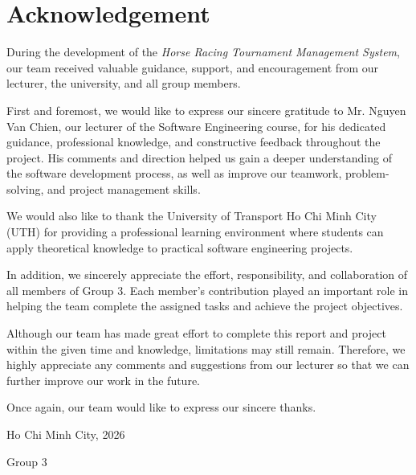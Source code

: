 \chapter*{Acknowledgement}

\sloppy

During the development of the \textit{Horse Racing Tournament Management System}, our team received valuable guidance, support, and encouragement from our lecturer, the university, and all group members.

First and foremost, we would like to express our sincere gratitude to Mr. Nguyen Van Chien, our lecturer of the Software Engineering course, for his dedicated guidance, professional knowledge, and constructive feedback throughout the project. His comments and direction helped us gain a deeper understanding of the software development process, as well as improve our teamwork, problem-solving, and project management skills.

We would also like to thank the University of Transport Ho Chi Minh City (UTH) for providing a professional learning environment where students can apply theoretical knowledge to practical software engineering projects.

In addition, we sincerely appreciate the effort, responsibility, and collaboration of all members of Group 3. Each member's contribution played an important role in helping the team complete the assigned tasks and achieve the project objectives.

Although our team has made great effort to complete this report and project within the given time and knowledge, limitations may still remain. Therefore, we highly appreciate any comments and suggestions from our lecturer so that we can further improve our work in the future.

Once again, our team would like to express our sincere thanks.

\vspace{1cm}

\begin{flushright}
	Ho Chi Minh City, 2026
	
	\vspace{0.5cm}
	
	Group 3
\end{flushright}